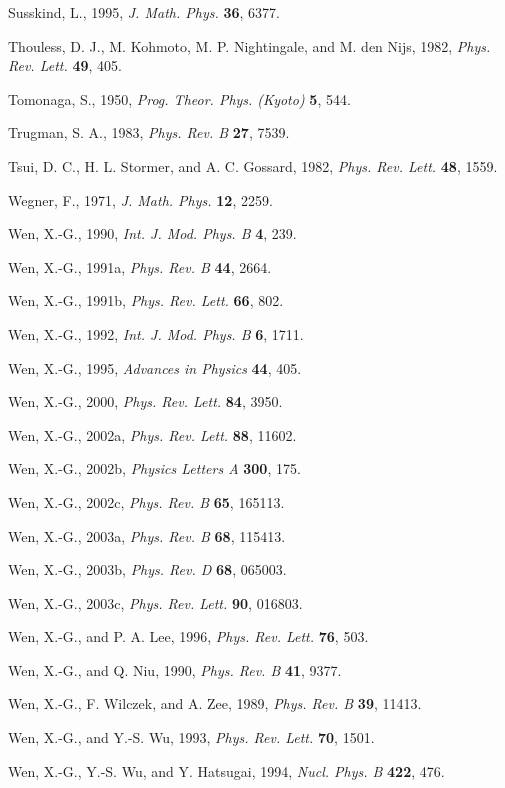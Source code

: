 \begin{list}{}{\setlength{\leftmargin}{2em}\setlength{\itemindent}{-2em}}
\item Susskind, L., 1995, \emph{J. Math. Phys.} \textbf{36}, 6377.
\item Thouless, D. J., M. Kohmoto, M. P. Nightingale, and M. den Nijs, 1982, \emph{Phys. Rev. Lett.} \textbf{49}, 405.
\item Tomonaga, S., 1950, \emph{Prog. Theor. Phys. (Kyoto)} \textbf{5}, 544.
\item Trugman, S. A., 1983, \emph{Phys. Rev. B} \textbf{27}, 7539.
\item Tsui, D. C., H. L. Stormer, and A. C. Gossard, 1982, \emph{Phys. Rev. Lett.} \textbf{48}, 1559.
\item Wegner, F., 1971, \emph{J. Math. Phys.} \textbf{12}, 2259.
\item Wen, X.-G., 1990, \emph{Int. J. Mod. Phys. B} \textbf{4}, 239.
\item Wen, X.-G., 1991a, \emph{Phys. Rev. B} \textbf{44}, 2664.
\item Wen, X.-G., 1991b, \emph{Phys. Rev. Lett.} \textbf{66}, 802.
\item Wen, X.-G., 1992, \emph{Int. J. Mod. Phys. B} \textbf{6}, 1711.
\item Wen, X.-G., 1995, \emph{Advances in Physics} \textbf{44}, 405.
\item Wen, X.-G., 2000, \emph{Phys. Rev. Lett.} \textbf{84}, 3950.
\item Wen, X.-G., 2002a, \emph{Phys. Rev. Lett.} \textbf{88}, 11602.
\item Wen, X.-G., 2002b, \emph{Physics Letters A} \textbf{300}, 175.
\item Wen, X.-G., 2002c, \emph{Phys. Rev. B} \textbf{65}, 165113.
\item Wen, X.-G., 2003a, \emph{Phys. Rev. B} \textbf{68}, 115413.
\item Wen, X.-G., 2003b, \emph{Phys. Rev. D} \textbf{68}, 065003.
\item Wen, X.-G., 2003c, \emph{Phys. Rev. Lett.} \textbf{90}, 016803.
\item Wen, X.-G., and P. A. Lee, 1996, \emph{Phys. Rev. Lett.} \textbf{76}, 503.
\item Wen, X.-G., and Q. Niu, 1990, \emph{Phys. Rev. B} \textbf{41}, 9377.
\item Wen, X.-G., F. Wilczek, and A. Zee, 1989, \emph{Phys. Rev. B} \textbf{39}, 11413.
\item Wen, X.-G., and Y.-S. Wu, 1993, \emph{Phys. Rev. Lett.} \textbf{70}, 1501.
\item Wen, X.-G., Y.-S. Wu, and Y. Hatsugai, 1994, \emph{Nucl. Phys. B} \textbf{422}, 476.

\end{list}
